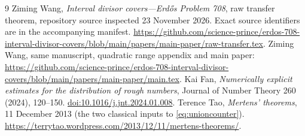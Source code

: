 \documentclass[11pt,a4paper]{article}
\begin{document}
\begin{thebibliography}{9}
\small
\setlength{\itemsep}{1pt}
 Ziming Wang, \emph{Interval divisor covers---Erd\H{o}s
Problem 708}, raw transfer theorem, repository source inspected
23 November 2026. Exact source identifiers are in the accompanying manifest.
\url{https://github.com/science-prince/erdos-708-interval-divisor-covers/blob/main/papers/main-paper/raw-transfer.tex}.
 Ziming Wang, same manuscript, quadratic range
appendix and main paper:
\url{https://github.com/science-prince/erdos-708-interval-divisor-covers/blob/main/papers/main-paper/main.tex}.
 Kai Fan, \emph{Numerically explicit estimates for the
distribution of rough numbers}, Journal of Number Theory 260 (2024),
120--150. \href{https://doi.org/10.1016/j.jnt.2024.01.008}{doi:10.1016/j.jnt.2024.01.008}.
 Terence Tao, \emph{Mertens' theorems}, 11 December 2013
(the two classical inputs to \eqref{eq:unioncounter}).
\url{https://terrytao.wordpress.com/2013/12/11/mertens-theorems/}.
\end{thebibliography}
\end{document}
